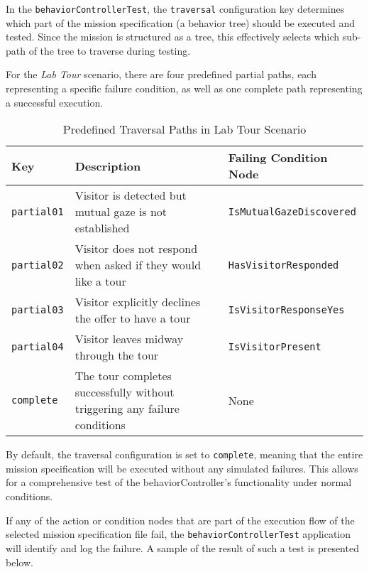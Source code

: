 \documentclass{CSSRforAfrica}
\begin{document}
In the \texttt{\small behaviorControllerTest}, the \texttt{\small traversal} configuration key determines which part of the mission specification (a behavior tree) should be executed and tested. Since the mission is structured as a tree, this effectively selects which sub-path of the tree to traverse during testing.

For the \textit{Lab Tour} scenario, there are four predefined partial paths, each representing a specific failure condition, as well as one complete path representing a successful execution.

\begin{longtable}[c]{|l|p{8cm}|l|}
    \caption{Predefined Traversal Paths in Lab Tour Scenario} \label{tab:traversal_paths}\\
    \hline
    \rowcolor{gray!30}
    \small{\textnormal{Key}} & \small{\textnormal{Description}} & \small{\textnormal{Failing Condition Node}} \\
    \hline
    \endfirsthead

    \small{\texttt{\small partial01}} & \small{Visitor is detected but mutual gaze is not established} & \small{\texttt{\small IsMutualGazeDiscovered}} \\\hline
    \small{\texttt{\small partial02}} & \small{Visitor does not respond when asked if they would like a tour} & \small{\texttt{\small HasVisitorResponded}} \\\hline
    \small{\texttt{\small partial03}} & \small{Visitor explicitly declines the offer to have a tour} & \small{\texttt{\small IsVisitorResponseYes}} \\\hline
    \small{\texttt{\small partial04}} & \small{Visitor leaves midway through the tour} & \small{\texttt{\small IsVisitorPresent}} \\\hline
    \small{\texttt{\small complete}} & \small{The tour completes successfully without triggering any failure conditions} & \small{None} \\\hline
\end{longtable}

By default, the traversal configuration is set to \texttt{\small complete}, meaning that the entire mission specification will be executed without any simulated failures. This allows for a comprehensive test of the behaviorController's functionality under normal conditions.


If any of the action or condition nodes that are part of the execution flow of the selected mission specification file fail, the \texttt{\small behaviorControllerTest} application will identify and log the failure. A sample of the result of such a test is presented below.
\end{document}
